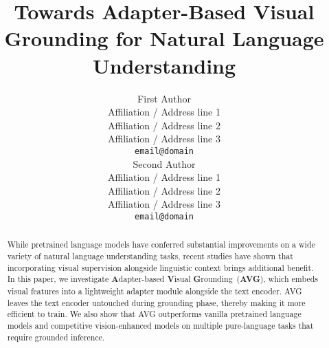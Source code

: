 \documentclass[11pt]{article}
\title{Towards Adapter-Based Visual Grounding for Natural Language Understanding}
\author{First Author \\
  Affiliation / Address line 1 \\
  Affiliation / Address line 2 \\
  Affiliation / Address line 3 \\
  \texttt{email@domain} \\\And
  Second Author \\
  Affiliation / Address line 1 \\
  Affiliation / Address line 2 \\
  Affiliation / Address line 3 \\
  \texttt{email@domain} \\}
\begin{document}
\maketitle
\begin{abstract}
While pretrained language models have conferred substantial improvements on a wide variety of natural language understanding tasks, recent studies have shown that incorporating visual supervision alongside linguistic context brings additional benefit. In this paper, we investigate \textbf{A}dapter-based \textbf{V}isual \textbf{G}rounding~(\textbf{AVG}), which embeds visual features into a lightweight adapter module alongside the text encoder. AVG leaves the text encoder untouched during grounding phase, thereby making it more efficient to train. We also show that AVG outperforms vanilla pretrained language models and competitive vision-enhanced models on multiple pure-language tasks that require grounded inference.
\end{abstract}





%






\end{document}
